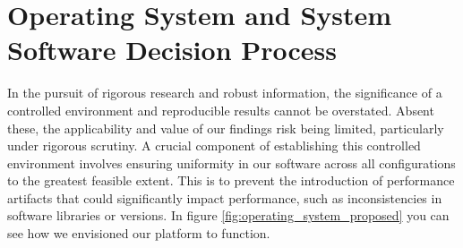

\section{Operating System and System Software Decision Process}

In the pursuit of rigorous research and robust information, the significance of a controlled environment and reproducible results cannot be overstated. Absent these, the applicability and value of our findings risk being limited, particularly under rigorous scrutiny. A crucial component of establishing this controlled environment involves ensuring uniformity in our software across all configurations to the greatest feasible extent. This is to prevent the introduction of performance artifacts that could significantly impact performance, such as inconsistencies in software libraries or versions. In figure \ref{fig:operating_system_proposed} you can see how we envisioned our platform to function.\\

